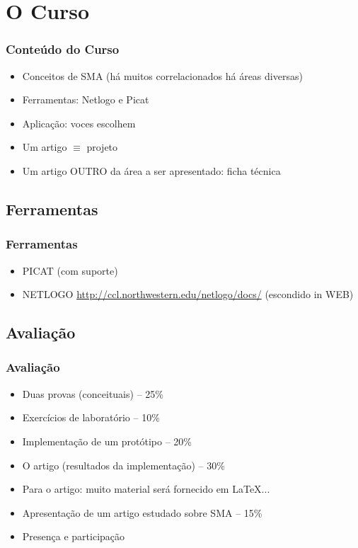 
\section{O Curso}
\begin{frame}

    \frametitle{Conteúdo do Curso}

    \begin{itemize}
      \item Conceitos de SMA (há muitos correlacionados há áreas diversas)
      \item Ferramentas: Netlogo e Picat
      \item Aplicação: voces escolhem
      \item Um artigo $ \equiv $ projeto
      \item Um artigo OUTRO da área a ser apresentado: ficha técnica
      
    \end{itemize}
\end{frame}

\subsection{Ferramentas}
\begin{frame}

    \frametitle{Ferramentas}

    \begin{itemize}
      \item PICAT (com suporte)
      \item NETLOGO
       \url{http://ccl.northwestern.edu/netlogo/docs/} (escondido in WEB)
      
    \end{itemize}
\end{frame}


\subsection{Avaliação}
\begin{frame}

    \frametitle{Avaliação}

    \begin{itemize}
      \item Duas provas (conceituais) -- 25\%
      \item Exercícios de laboratório  -- 10\%
      \item Implementação de um protótipo  -- 20\%
       \item O artigo (resultados da implementação)  -- 30\%

      \item Para o artigo: muito material será fornecido em \LaTeX ...

      \item Apresentação de um artigo estudado sobre SMA -- 15\%
 
      \item Presença e participação
      
    \end{itemize}
\end{frame}



